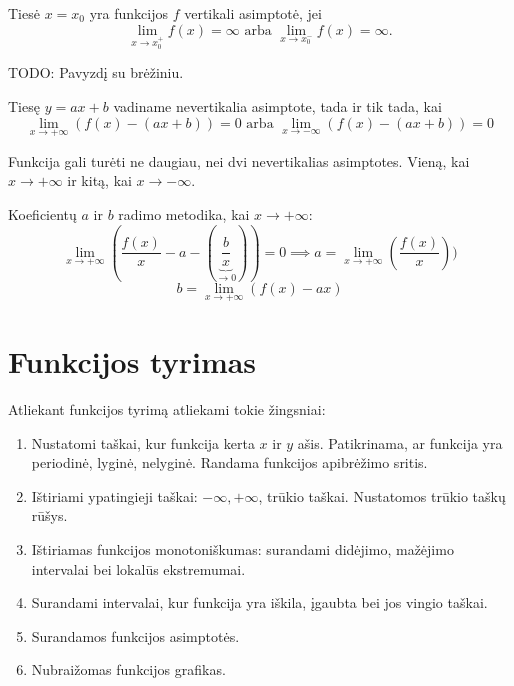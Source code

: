 \begin{defn}
  Tiesė $x = x_{0}$ yra funkcijos $f$ vertikali asimptotė, jei 
  \begin{equation*}
    \lim_{x \to x_{0}^{+}} f(x) = \infty \text{ arba }
    \lim_{x \to x_{0}^{-}} f(x) = \infty.
  \end{equation*}

  TODO: Pavyzdį su brėžiniu.
\end{defn}

\begin{defn}
  Tiesę $y = ax + b$ vadiname nevertikalia asimptote, tada ir tik tada, kai
  \begin{equation*}
    \lim_{x \to +\infty} (f(x) - (ax + b)) = 0 \text{ arba }
    \lim_{x \to -\infty} (f(x) - (ax + b)) = 0
  \end{equation*}

  \begin{note}
    Funkcija gali turėti ne daugiau, nei dvi nevertikalias asimptotes. 
    Vieną, kai $x \to +\infty$ ir kitą, kai $x \to -\infty$.
  \end{note}

  \begin{note}
    Koeficientų $a$ ir $b$ radimo metodika, kai $x \to +\infty$:
    \begin{equation*}
      \lim_{x \to +\infty} \left( \frac{f(x)}{x} - a - 
        \left( \underbrace{\frac{b}{x}}_{\to 0} \right) \right) = 0
        \implies a = \lim_{x \to +\infty} \left( \frac{f(x)}{x} \right))
    \end{equation*}
    \begin{equation*}
      b = \lim_{x \to +\infty} (f(x) - ax)
    \end{equation*}
  \end{note}
\end{defn}

\section{Funkcijos tyrimas}

Atliekant funkcijos tyrimą atliekami tokie žingsniai:
\begin{enumerate}
  \item Nustatomi taškai, kur funkcija kerta $x$ ir $y$ ašis. Patikrinama,
    ar funkcija yra periodinė, lyginė, nelyginė. Randama funkcijos
    apibrėžimo sritis.
  \item Ištiriami ypatingieji taškai: $-\infty, +\infty$, trūkio taškai.
    Nustatomos trūkio taškų rūšys.
  \item Ištiriamas funkcijos monotoniškumas: surandami didėjimo, mažėjimo
    intervalai bei lokalūs ekstremumai.
  \item Surandami intervalai, kur funkcija yra iškila, įgaubta bei jos
    vingio taškai.
  \item Surandamos funkcijos asimptotės.
  \item Nubraižomas funkcijos grafikas.
\end{enumerate}
